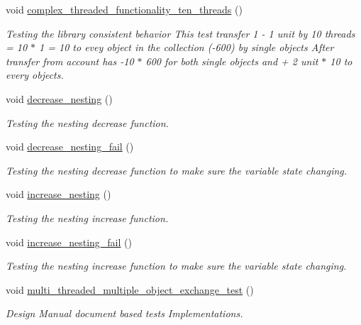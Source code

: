 \begin{DoxyCompactItemize}
\item 
void \hyperlink{class_my_test_c_ase_ad91f8c37cd32055b834c84f10edeb979_ad91f8c37cd32055b834c84f10edeb979}{complex\+\_\+threaded\+\_\+functionality\+\_\+ten\+\_\+threads} ()
\begin{DoxyCompactList}\small\item\em Testing the library consistent behavior This test transfer 1 -\/ 1 unit by 10 threads = 10 $\ast$ 1 = 10 to evey object in the collection (-\/600) by single objects After transfer from account has -\/10 $\ast$ 600 for both single objects and + 2 unit $\ast$ 10 to every objects. \end{DoxyCompactList}\item 
void \hyperlink{class_my_test_c_ase_a2da7267d6799893e898032f5ae54c1e1_a2da7267d6799893e898032f5ae54c1e1}{decrease\+\_\+nesting} ()
\begin{DoxyCompactList}\small\item\em Testing the nesting decrease function. \end{DoxyCompactList}\item 
void \hyperlink{class_my_test_c_ase_ad2bec86c60b7992f24c4d59a00a1433b_ad2bec86c60b7992f24c4d59a00a1433b}{decrease\+\_\+nesting\+\_\+fail} ()
\begin{DoxyCompactList}\small\item\em Testing the nesting decrease function to make sure the variable state changing. \end{DoxyCompactList}\item 
void \hyperlink{class_my_test_c_ase_aadf771b5eefc5f32984cb6c177d217d0_aadf771b5eefc5f32984cb6c177d217d0}{increase\+\_\+nesting} ()
\begin{DoxyCompactList}\small\item\em Testing the nesting increase function. \end{DoxyCompactList}\item 
void \hyperlink{class_my_test_c_ase_af72ca0f6e19543b2bc80f8fc5181dae7_af72ca0f6e19543b2bc80f8fc5181dae7}{increase\+\_\+nesting\+\_\+fail} ()
\begin{DoxyCompactList}\small\item\em Testing the nesting increase function to make sure the variable state changing. \end{DoxyCompactList}\item 
void \hyperlink{class_my_test_c_ase_a41c93b64fb95fa83809b6457b608e2da_a41c93b64fb95fa83809b6457b608e2da}{multi\+\_\+threaded\+\_\+multiple\+\_\+object\+\_\+exchange\+\_\+test} ()
\begin{DoxyCompactList}\small\item\em Design Manual document based tests Implementations. \end{DoxyCompactList}\item 

\end{DoxyCompactItemize}
